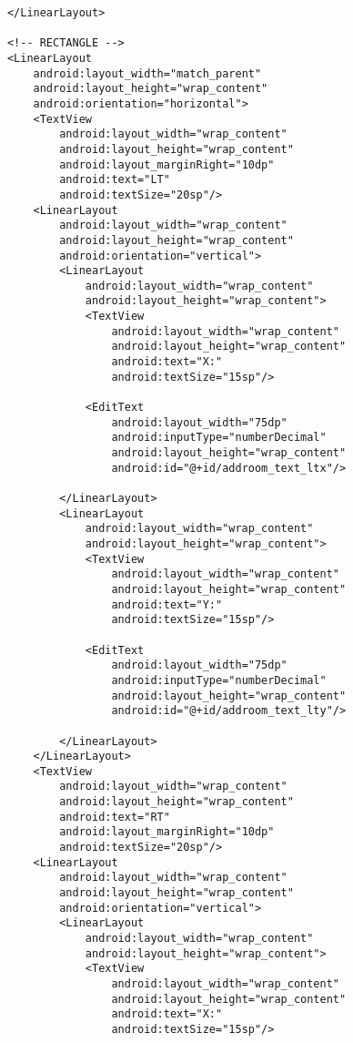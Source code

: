 \begin{lstlisting}
            </LinearLayout>

            <!-- RECTANGLE -->
            <LinearLayout
                android:layout_width="match_parent"
                android:layout_height="wrap_content"
                android:orientation="horizontal">
                <TextView
                    android:layout_width="wrap_content"
                    android:layout_height="wrap_content"
                    android:layout_marginRight="10dp"
                    android:text="LT"
                    android:textSize="20sp"/>
                <LinearLayout
                    android:layout_width="wrap_content"
                    android:layout_height="wrap_content"
                    android:orientation="vertical">
                    <LinearLayout
                        android:layout_width="wrap_content"
                        android:layout_height="wrap_content">
                        <TextView
                            android:layout_width="wrap_content"
                            android:layout_height="wrap_content"
                            android:text="X:"
                            android:textSize="15sp"/>

                        <EditText
                            android:layout_width="75dp"
                            android:inputType="numberDecimal"
                            android:layout_height="wrap_content"
                            android:id="@+id/addroom_text_ltx"/>

                    </LinearLayout>
                    <LinearLayout
                        android:layout_width="wrap_content"
                        android:layout_height="wrap_content">
                        <TextView
                            android:layout_width="wrap_content"
                            android:layout_height="wrap_content"
                            android:text="Y:"
                            android:textSize="15sp"/>

                        <EditText
                            android:layout_width="75dp"
                            android:inputType="numberDecimal"
                            android:layout_height="wrap_content"
                            android:id="@+id/addroom_text_lty"/>

                    </LinearLayout>
                </LinearLayout>
                <TextView
                    android:layout_width="wrap_content"
                    android:layout_height="wrap_content"
                    android:text="RT"
                    android:layout_marginRight="10dp"
                    android:textSize="20sp"/>
                <LinearLayout
                    android:layout_width="wrap_content"
                    android:layout_height="wrap_content"
                    android:orientation="vertical">
                    <LinearLayout
                        android:layout_width="wrap_content"
                        android:layout_height="wrap_content">
                        <TextView
                            android:layout_width="wrap_content"
                            android:layout_height="wrap_content"
                            android:text="X:"
                            android:textSize="15sp"/>


\end{lstlisting}
